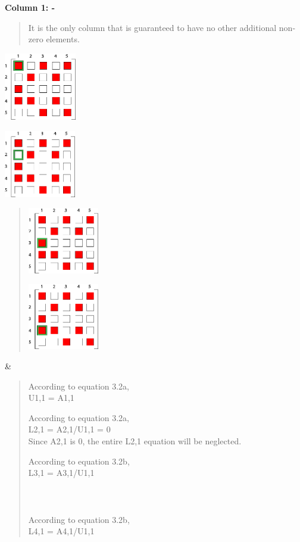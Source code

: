 
\textbf{Column 1: -}

\begin{quote}
It is the only column that is guaranteed to have no other additional
non-zero elements.
\end{quote}



\begin{minipage}[t]{\linewidth}\raggedright
\includegraphics[width=1.2375in,height=1.16016in]{./Scheduler/media/image19.png}

\includegraphics[width=1.23194in,height=1.15466in]{./Scheduler/media/image20.png}

\begin{quote}
\includegraphics[width=1.21944in,height=1.14209in]{./Scheduler/media/image21.png}

\includegraphics[width=1.21667in,height=1.13495in]{./Scheduler/media/image22.png}
\end{quote}
\end{minipage} \& \begin{minipage}[t]{\linewidth}\raggedright
\begin{quote}
According to equation 3.2a,\\
U1,1 = A1,1

According to equation 3.2a,\\
L2,1 = A2,1/U1,1 = 0\\
Since A2,1 is 0, the entire L2,1 equation will be neglected.

According to equation 3.2b,\\
L3,1 = A3,1/U1,1\\
~\\
~\\
~\\
According to equation 3.2b,\\
L4,1 = A4,1/U1,1
\end{quote}
\end{minipage} \\
